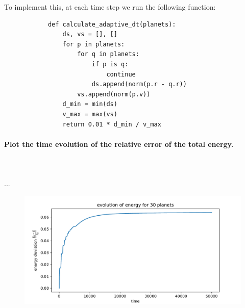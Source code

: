        \newpage \noindent
        To implement this, at each time step we run the following function:
        \begin{lstlisting}
            def calculate_adaptive_dt(planets):
                ds, vs = [], []
                for p in planets:
                    for q in planets:
                        if p is q:
                            continue
                        ds.append(norm(p.r - q.r))
                    vs.append(norm(p.v))
                d_min = min(ds)
                v_max = max(vs)
                return 0.01 * d_min / v_max \end{lstlisting}

    \paragraph{Plot the time evolution of the relative error of the total 
        energy.
    } \ \\
        \\ 
        ...
        \begin{figure}[h!]
            \centering
            \includegraphics[width=\textwidth]{./figures/task2_30body_energy.pdf}
        \end{figure} \ \\ 

    \newpage
